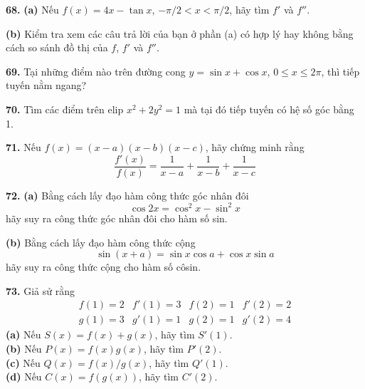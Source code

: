 \setlength{\abovedisplayskip}{3pt}
\setlength{\belowdisplayskip}{3pt}
\setlength{\abovedisplayshortskip}{1pt}
\setlength{\belowdisplayshortskip}{2pt}

\noindent
\begin{minipage}[t]{0.485\textwidth}
    \noindent\textbf{68.} \textbf{(a)} Nếu $f(x) = 4x - \tan x$, $-\pi/2 < x < \pi/2$, hãy tìm $f'$ và $f''$.
    \par\smallskip
    \noindent\llap{\graphingicon\hspace{5pt}}\hspace*{1.4em}\textbf{(b)} Kiểm tra xem các câu trả lời của bạn ở phần (a) có hợp lý hay không bằng cách so sánh đồ thị của $f$, $f'$ và $f''$.

    \par\medskip
    \noindent\textbf{69.} Tại những điểm nào trên đường cong $y = \sin x + \cos x$, $0 \leqslant x \leqslant 2\pi$, thì tiếp tuyến nằm ngang?

    \par\medskip
    \noindent\textbf{70.} Tìm các điểm trên elip $x^2 + 2y^2 = 1$ mà tại đó tiếp tuyến có hệ số góc bằng 1.

    \par\medskip
    \noindent\textbf{71.} Nếu $f(x) = (x - a)(x - b)(x - c)$, hãy chứng minh rằng
    \[
    \frac{f'(x)}{f(x)} = \frac{1}{x - a} + \frac{1}{x - b} + \frac{1}{x - c}
    \]

    \noindent\textbf{72.} \textbf{(a)} Bằng cách lấy đạo hàm công thức góc nhân đôi
    \[
    \cos 2x = \cos^2 x - \sin^2 x
    \]
    hãy suy ra công thức góc nhân đôi cho hàm số sin.
    \par\smallskip
    \noindent\hspace*{1.4em}\textbf{(b)} Bằng cách lấy đạo hàm công thức cộng
    \[
    \sin(x + a) = \sin x \cos a + \cos x \sin a
    \]
    hãy suy ra công thức cộng cho hàm số côsin.

    \par\medskip
    \noindent\textbf{73.} Giả sử rằng
    \[
    \begin{array}{llll}
    f(1) = 2 & f'(1) = 3 & f(2) = 1 & f'(2) = 2 \\
    g(1) = 3 & g'(1) = 1 & g(2) = 1 & g'(2) = 4
    \end{array}
    \]
    \textbf{(a)} Nếu $S(x) = f(x) + g(x)$, hãy tìm $S'(1)$.\\
    \textbf{(b)} Nếu $P(x) = f(x)g(x)$, hãy tìm $P'(2)$.\\
    \textbf{(c)} Nếu $Q(x) = f(x)/g(x)$, hãy tìm $Q'(1)$.\\
    \textbf{(d)} Nếu $C(x) = f(g(x))$, hãy tìm $C'(2)$.


\end{minipage}
